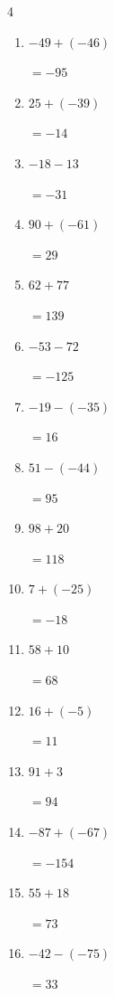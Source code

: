 \begin{multicols}{4}
\begin{enumerate}
        $=-3$

  \item $-49+(-46)$

        $=-95$

  \item $25+(-39)$

        $=-14$

  \item $-18-13$

        $=-31$

  \item $90+(-61)$

        $=29$

  \item $62+77$

        $=139$

  \item $-53-72$

        $=-125$

  \item $-19-(-35)$

        $=16$

  \item $51-(-44)$

        $=95$

  \item $98+20$

        $=118$

  \item $7+(-25)$

        $=-18$

  \item $58+10$

        $=68$

  \item $16+(-5)$

        $=11$

  \item $91+3$

        $=94$

  \item $-87+(-67)$

        $=-154$

  \item $55+18$

        $=73$

\columnbreak %

\resetques

  \item $-42-(-75)$

        $=33$


\end{enumerate}
\end{multicols}
